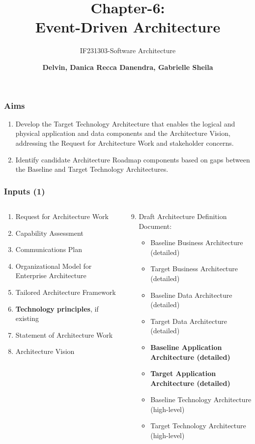 \documentclass[aspectratio=169, table]{beamer}
\subtitle{IF231303-Software Architecture}
\title{\Large Chapter-6:\\Event-Driven Architecture}
\author[Pradita]{\small {\textbf{Delvin, Danica Recca Danendra, Gabrielle Sheila}}}
\begin{document}
	\frame{\titlepage}

	\begin{frame}
		\frametitle{Aims}
		\begin{enumerate}
			\item Develop the Target Technology Architecture that enables the logical and physical application and data components and the Architecture Vision, addressing the Request for Architecture Work and stakeholder concerns.
			\item Identify candidate Architecture Roadmap components based on gaps between the Baseline and Target Technology Architectures.
		\end{enumerate}
	\end{frame}

	\begin{frame}
		\frametitle{Inputs (1)}
		\vspace{20pt}
		\begin{columns}[onlytextwidth]
			\begin{column}{0.45\textwidth}
				\begin{enumerate}
					\item Request for Architecture Work
					\item Capability Assessment
					\item Communications Plan
					\item Organizational Model for Enterprise Architecture
					\item Tailored Architecture Framework
					\item \textbf{Technology principles}, if existing
					\item Statement of Architecture Work
					\item Architecture Vision
				\end{enumerate}
			\end{column}
			\begin{column}{0.55\textwidth}
				\begin{enumerate}
					\setcounter{enumi}{8}
					\item Draft Architecture Definition Document:
					\begin{itemize}
						\item Baseline Business Architecture (detailed)
						\item Target Business Architecture (detailed)
						\item Baseline Data Architecture (detailed)
						\item Target Data Architecture (detailed)
						\item \textbf{Baseline Application Architecture (detailed)}
						\item \textbf{Target Application Architecture (detailed)}
						\item Baseline Technology Architecture (high-level)
						\item Target Technology Architecture (high-level)
					\end{itemize}
				\end{enumerate}
			\end{column}
		\end{columns}
	\end{frame}
\end{document}
